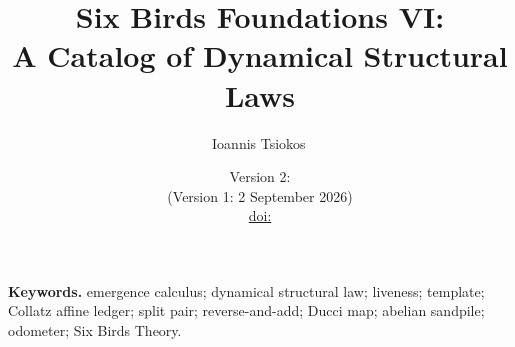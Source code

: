\documentclass[11pt]{article}
\title{Six Birds Foundations VI:\\
A Catalog of Dynamical Structural Laws}
\author{Ioannis Tsiokos\,\orcidlink{0009-0009-7659-5964}}
\date{Version 2: \manuscriptdate\\[2pt] \footnotesize (Version 1: 2 September 2026)%
  \ifpaperhasdoi\\\small\href{https://doi.org/\paperdoi}{doi:\paperdoi}\fi}
\theoremstyle{definition}
\theoremstyle{plain}\newtheorem*{headline}{Theorem}
\begin{document}
\maketitle
\thispagestyle{firstpage}

\begin{abstract}

\end{abstract}

\medskip
\noindent\textbf{Keywords.} emergence calculus; dynamical structural law; liveness; template;
Collatz affine ledger; split pair; reverse-and-add; Ducci map; abelian sandpile; odometer;
Six Birds Theory.










\clearpage


\end{document}
